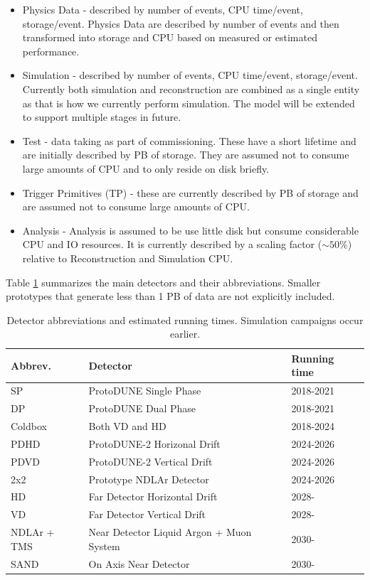 \documentclass[12pt]{article}
\begin{document}
\begin{itemize}
\item Physics Data - described by number of events, CPU time/event, storage/event.  Physics Data are described by number of events and then transformed into storage and CPU based on measured or estimated performance. 
\item Simulation - described by number of events,  CPU time/event, storage/event.  Currently both simulation and reconstruction are combined as a single entity as that is how we currently perform simulation.  The model will be extended to support multiple stages in future. 
\item Test - data taking as part of commissioning.  These have a short lifetime and are initially described by PB of storage. They are assumed not to consume large amounts of CPU and to only reside on disk briefly. 
\item Trigger Primitives (TP) -  these are currently described by PB of storage and are assumed not to consume large amounts of CPU.  
\item Analysis - Analysis is assumed to be use little disk but consume considerable CPU and IO resources.  It is currently described by a scaling factor ($\sim 50\%$) relative to Reconstruction and Simulation CPU.
\end{itemize}

 Table \ref{tab:detectors} summarizes the main detectors and their abbreviations. Smaller prototypes that generate less than 1 PB of data  are not explicitly included. 

\begin{table}[h]
\begin{centering}
  \begin{tabular}{|l|l|l|}
     \hline
    Abbrev. & Detector & Running time\\
    \hline
    SP & ProtoDUNE Single Phase & 2018-2021\\
    DP & ProtoDUNE Dual Phase & 2018-2021\\
    Coldbox & Both VD and HD & 2018-2024\\
    PDHD & ProtoDUNE-2 Horizonal Drift & 2024-2026\\
    PDVD & ProtoDUNE-2 Vertical Drift & 2024-2026\\
    2x2& Prototype NDLAr Detector & 2024-2026\\
    HD & Far Detector Horizontal Drift & 2028-\\
    VD & Far Detector Vertical Drift & 2028-\\
    NDLAr + TMS & Near Detector Liquid Argon + Muon System & 2030-\\
    SAND & On Axis Near Detector & 2030- \\
     \hline
     \end{tabular}
       \caption{Detector abbreviations and estimated running times.  Simulation campaigns occur earlier. }\label{tab:detectors}
  \end{centering}
   
     \end{table}
     
\end{document}
